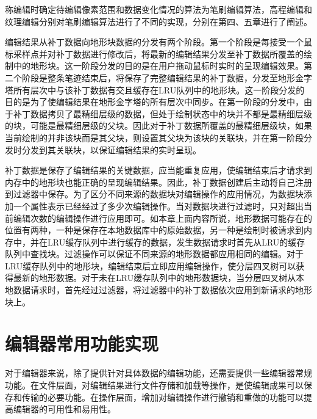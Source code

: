 称编辑时确定待编辑像素范围和数据变化情况的算法为笔刷编辑算法，高程编辑和纹理编辑分别对笔刷编辑算法进行了不同的实现，分别在第四、五章进行了阐述。\par
编辑结果从补丁数据向地形块数据的分发有两个阶段。第一个阶段是每接受一个鼠标采样点并对补丁数据进行修改后，将最新的编辑结果分发至补丁数据所覆盖的绘制中的地形块。这一阶段分发的目的是在用户拖动鼠标时实时的呈现编辑效果。第二个阶段是整条笔迹结束后，将保存了完整编辑结果的补丁数据，分发至地形金字塔所有层次中与该补丁数据有交且缓存在LRU队列中的地形块。这一阶段分发的目的是为了使编辑结果在地形金字塔的所有层次中同步。在第一阶段的分发中，由于补丁数据拷贝了最精细层级的数据，但处于绘制状态中的块并不都是最精细层级的块，可能是最精细层级的父块。因此对于补丁数据所覆盖的最精细层级块，如果当前绘制的并非该块而是其父块，则设置其父块为该块的关联块，并在第一阶段分发时分发到其关联块，以保证编辑结果的实时呈现。\par

补丁数据是保存了编辑结果的关键数据，应当能重复应用，使编辑结束后才请求到内存中的地形块也能正确的呈现编辑结果。因此，补丁数据创建后主动将自己注册到过滤器中保存。为了区分不同来源的数据块对编辑操作的应用情况，为数据块添加一个属性表示已经经过了多少次编辑操作。当对数据块进行过滤时，只对超出当前编辑次数的编辑操作进行应用即可。如本章上面内容所说，地形数据可能存在的位置有两种，一种是保存在本地数据库中的原始数据，另一种是绘制时被请求到内存中，并在LRU缓存队列中进行缓存的数据，发生数据请求时首先从LRU的缓存队列中查找块。过滤操作可以保证不同来源的地形数据都应用相同的编辑。对于LRU缓存队列中的地形块，编辑结束后立即应用编辑操作，使分层四叉树可以获得最新的地形数据。对于未在LRU缓存队列中的地形数据块，当分层四叉树从本地数据请求时，首先经过过滤器，将过滤器中的补丁数据依次应用到新请求的地形块上。\par

\section{编辑器常用功能实现}
对于编辑器来说，除了提供针对具体数据的编辑功能，还需要提供一些编辑器常规功能。在文件层面，对编辑结果进行文件存储和加载等操作，是使编辑成果可以保存和传输的必要功能。在操作层面，增加对编辑操作进行撤销和重做的功能可以提高编辑器的可用性和易用性。


